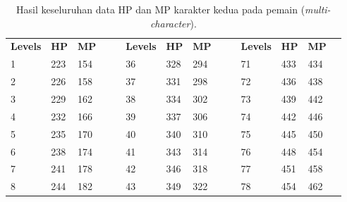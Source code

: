 \begin{table}[!h]
	\centering
	\caption{Hasil keseluruhan data HP dan MP karakter kedua pada pemain (\textit{multi-character}).}
	\vspace{-1ex}
	\label{tb:player_hp_mp_all_2}
	\begin{tabular}{|l|l|l|ll|l|l|l|llllll}
		\cline{1-3} \cline{6-8} \cline{11-13}
		\cellcolor[HTML]{C0C0C0}\textbf{Levels} & \cellcolor[HTML]{C0C0C0}\textbf{HP} & \cellcolor[HTML]{C0C0C0}\textbf{MP} &  &  & \cellcolor[HTML]{C0C0C0}\textbf{Levels} & \cellcolor[HTML]{C0C0C0}\textbf{HP} & \cellcolor[HTML]{C0C0C0}\textbf{MP} &  & \multicolumn{1}{l|}{} & \multicolumn{1}{l|}{\cellcolor[HTML]{C0C0C0}\textbf{Levels}} & \multicolumn{1}{l|}{\cellcolor[HTML]{C0C0C0}\textbf{HP}} & \multicolumn{1}{l|}{\cellcolor[HTML]{C0C0C0}\textbf{MP}} &  \\ \cline{1-3} \cline{6-8} \cline{11-13}
		1 & 223 & 154 &  &  & 36 & 328 & 294 &  & \multicolumn{1}{l|}{} & \multicolumn{1}{l|}{71} & \multicolumn{1}{l|}{433} & \multicolumn{1}{l|}{434} &  \\ \cline{1-3} \cline{6-8} \cline{11-13}
		2 & 226 & 158 &  &  & 37 & 331 & 298 &  & \multicolumn{1}{l|}{} & \multicolumn{1}{l|}{72} & \multicolumn{1}{l|}{436} & \multicolumn{1}{l|}{438} &  \\ \cline{1-3} \cline{6-8} \cline{11-13}
		3 & 229 & 162 &  &  & 38 & 334 & 302 &  & \multicolumn{1}{l|}{} & \multicolumn{1}{l|}{73} & \multicolumn{1}{l|}{439} & \multicolumn{1}{l|}{442} &  \\ \cline{1-3} \cline{6-8} \cline{11-13}
		4 & 232 & 166 &  &  & 39 & 337 & 306 &  & \multicolumn{1}{l|}{} & \multicolumn{1}{l|}{74} & \multicolumn{1}{l|}{442} & \multicolumn{1}{l|}{446} &  \\ \cline{1-3} \cline{6-8} \cline{11-13}
		5 & 235 & 170 &  &  & 40 & 340 & 310 &  & \multicolumn{1}{l|}{} & \multicolumn{1}{l|}{75} & \multicolumn{1}{l|}{445} & \multicolumn{1}{l|}{450} &  \\ \cline{1-3} \cline{6-8} \cline{11-13}
		6 & 238 & 174 &  &  & 41 & 343 & 314 &  & \multicolumn{1}{l|}{} & \multicolumn{1}{l|}{76} & \multicolumn{1}{l|}{448} & \multicolumn{1}{l|}{454} &  \\ \cline{1-3} \cline{6-8} \cline{11-13}
		7 & 241 & 178 &  &  & 42 & 346 & 318 &  & \multicolumn{1}{l|}{} & \multicolumn{1}{l|}{77} & \multicolumn{1}{l|}{451} & \multicolumn{1}{l|}{458} &  \\ \cline{1-3} \cline{6-8} \cline{11-13}
		8 & 244 & 182 &  &  & 43 & 349 & 322 &  & \multicolumn{1}{l|}{} & \multicolumn{1}{l|}{78} & \multicolumn{1}{l|}{454} & \multicolumn{1}{l|}{462} &  \\ \cline{1-3} \cline{6-8} \cline{11-13}

\end{tabular}
\end{table}
